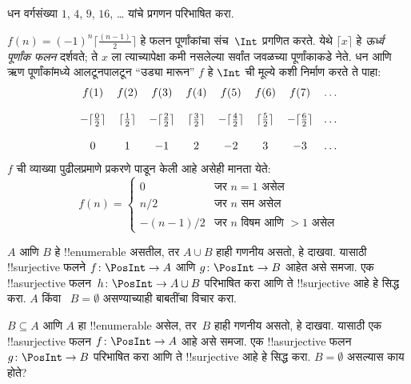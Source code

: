 \documentclass[../../../include/open-logic-section]{subfiles}
\begin{document}
\begin{prob}
धन वर्गसंख्या $1$, $4$, $9$, $16$, \dots{} यांचे प्रगणन परिभाषित करा.
\end{prob}

\begin{ex}
$f(n) = (-1)^{n} \lceil \frac{(n-1)}{2}\rceil$ हे फलन पूर्णांकांचा
संच~$\Int$ प्रगणित करते. येथे $\lceil x \rceil$ हे
\emph{ऊर्ध्व पूर्णांक फलन} दर्शवते; ते $x$ ला त्याच्यापेक्षा कमी
नसलेल्या सर्वांत जवळच्या पूर्णांकाकडे नेते. धन आणि ऋण पूर्णांकांमध्ये
आलटूनपालटून ``उड्या मारून'' $f$ हे $\Int$ ची मूल्ये कशी निर्माण
करते ते पाहा:
\[
\begin{array}{c c c c c c c c}
f(1) & f(2) & f(3) & f(4) & f(5) & f(6) & f(7) & \dots \\ \\
- \lceil \tfrac{0}{2} \rceil & \lceil \tfrac{1}{2}\rceil & - \lceil \tfrac{2}{2} \rceil & \lceil \tfrac{3}{2} \rceil & - \lceil \tfrac{4}{2} \rceil  & \lceil \tfrac{5}{2}
\rceil & - \lceil \tfrac{6}{2} \rceil & \dots \\ \\
0 & 1 & -1 & 2 & -2 & 3 & -3 & \dots
\end{array}
\]
$f$ ची व्याख्या पुढीलप्रमाणे प्रकरणे पाडून केली आहे असेही मानता येते:
\[
f(n) = \begin{cases}
  0 & \text{जर $n = 1$ असेल}\\
  n/2 & \text{जर $n$ सम असेल}\\
  -(n-1)/2 & \text{जर $n$ विषम आणि $>1$ असेल}
  \end{cases}
\]
\end{ex}

\begin{prob}
  $A$ आणि $B$ हे !!{enumerable} असतील, तर $A \cup B$ हाही
  गणनीय असतो, हे दाखवा. यासाठी !!{surjective} फलने
  $f\colon \PosInt \to A$ आणि $g\colon \PosInt \to B$ आहेत असे
  समजा. एक !!a{surjective} फलन~$h\colon \PosInt \to A \cup B$
  परिभाषित करा आणि ते !!{surjective} आहे हे सिद्ध करा. $A$ किंवा
  ~$B = \emptyset$ असण्याच्याही बाबतींचा विचार करा.
\end{prob}

\begin{prob}
  $B \subseteq A$ आणि $A$ हा !!{enumerable} असेल, तर~$B$ हाही
  गणनीय असतो, हे दाखवा. यासाठी एक !!a{surjective} फलन
  $f\colon \PosInt \to A$ आहे असे समजा. एक !!a{surjective}
  फलन~$g\colon \PosInt \to B$ परिभाषित करा आणि ते
  !!{surjective} आहे हे सिद्ध करा. $B = \emptyset$ असल्यास काय होते?
\end{prob}
\end{document}
